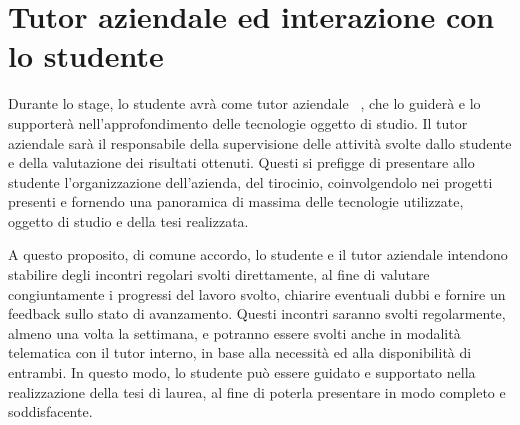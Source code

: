 \section*{Tutor aziendale ed interazione con lo studente}

Durante lo stage, lo studente avrà come tutor aziendale \nomeTutorAziendale\ \cognomeTutorAziendale, che lo guiderà e lo supporterà nell'approfondimento delle tecnologie oggetto di studio. 
Il tutor aziendale sarà il responsabile della supervisione delle attività svolte dallo studente e della valutazione dei risultati ottenuti. 
Questi si prefigge di presentare allo studente l'organizzazione dell'azienda, 
del tirocinio, coinvolgendolo nei progetti presenti e fornendo una panoramica di massima delle tecnologie utilizzate, oggetto di studio e della tesi realizzata.

\medskip

A questo proposito, di comune accordo, lo studente e il tutor aziendale intendono stabilire degli incontri regolari svolti direttamente, 
al fine di valutare congiuntamente i progressi del lavoro svolto, chiarire eventuali dubbi e fornire un feedback sullo stato di avanzamento.
Questi incontri saranno svolti regolarmente, almeno una volta la settimana, e potranno essere svolti anche in modalità telematica con il tutor interno, in base alla necessità ed alla disponibilità di entrambi.
In questo modo, lo studente può essere guidato e supportato nella realizzazione della tesi di laurea, al fine di poterla presentare in modo completo e soddisfacente.


